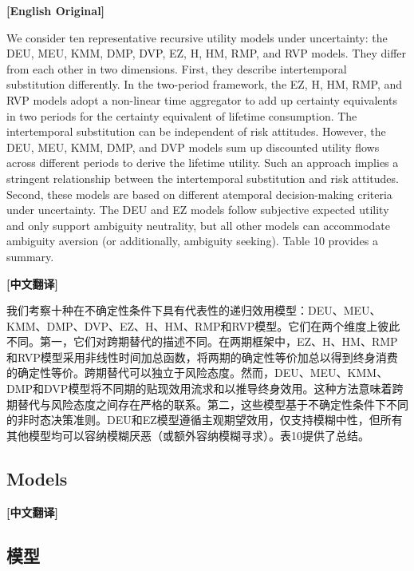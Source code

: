 \documentclass[12pt,a4paper]{ctexart}
\newenvironment{original}{%
  \par\medskip\noindent\textbf{[English Original]}\par\smallskip
  \color{black}\small
}{%
  \par\medskip
}
\newenvironment{translation}{%
  \par\noindent\textbf{[中文翻译]}\par\smallskip
  \color{blue}\small
}{%
  \par\bigskip
}
\theoremstyle{definition}
\theoremstyle{remark}
\begin{document}
\begin{original}
We consider ten representative recursive utility models under uncertainty: the DEU, MEU, KMM, DMP, DVP, EZ, H, HM, RMP, and RVP models. They differ from each other in two dimensions. First, they describe intertemporal substitution differently. In the two-period framework, the EZ, H, HM, RMP, and RVP models adopt a non-linear time aggregator to add up certainty equivalents in two periods for the certainty equivalent of lifetime consumption. The intertemporal substitution can be independent of risk attitudes. However, the DEU, MEU, KMM, DMP, and DVP models sum up discounted utility flows across different periods to derive the lifetime utility. Such an approach implies a stringent relationship between the intertemporal substitution and risk attitudes. Second, these models are based on different atemporal decision-making criteria under uncertainty. The DEU and EZ models follow subjective expected utility and only support ambiguity neutrality, but all other models can accommodate ambiguity aversion (or additionally, ambiguity seeking). Table 10 provides a summary.
\end{original}
\begin{translation}
我们考察十种在不确定性条件下具有代表性的递归效用模型：DEU、MEU、KMM、DMP、DVP、EZ、H、HM、RMP和RVP模型。它们在两个维度上彼此不同。第一，它们对跨期替代的描述不同。在两期框架中，EZ、H、HM、RMP和RVP模型采用非线性时间加总函数，将两期的确定性等价加总以得到终身消费的确定性等价。跨期替代可以独立于风险态度。然而，DEU、MEU、KMM、DMP和DVP模型将不同期的贴现效用流求和以推导终身效用。这种方法意味着跨期替代与风险态度之间存在严格的联系。第二，这些模型基于不确定性条件下不同的非时态决策准则。DEU和EZ模型遵循主观期望效用，仅支持模糊中性，但所有其他模型均可以容纳模糊厌恶（或额外容纳模糊寻求）。表10提供了总结。
\end{translation}

\subsection{Models}
\begin{translation}
\subsection*{模型}
\end{translation}
\end{document}
